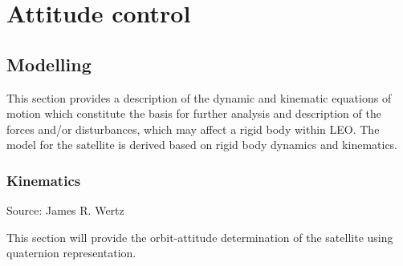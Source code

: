 \chapter{Attitude control}
\section{Modelling}
This section provides a description of the dynamic and kinematic equations of motion which constitute the basis for further analysis and description of the forces and/or disturbances, which may affect a rigid body within LEO. The model for the satellite is derived based on rigid body dynamics and kinematics. 
%
\subsection{Kinematics}
Source: James R. Wertz \cite{SADC}

This section will provide the orbit-attitude determination of the satellite using quaternion representation. 

